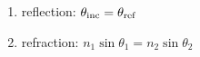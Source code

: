 

\vspace*{\fill}
\centering

\begin{enumerate}
    \item reflection: $\theta_{\rm inc} = \theta_{\rm ref}$ 
    \item refraction: $n_1 \sin{\theta_1} = n_2 \sin{\theta_2}$
\end{enumerate}

\centering
\vspace*{\fill}

